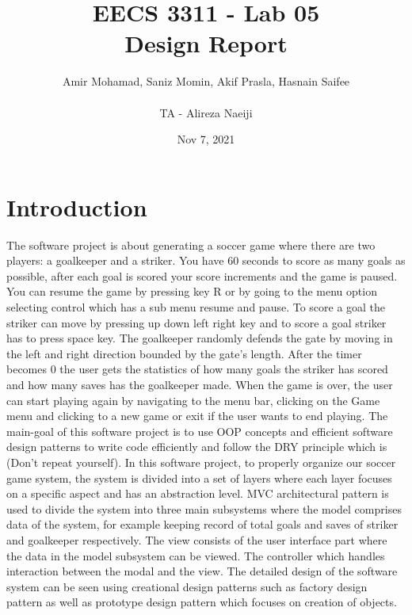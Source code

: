 \documentclass[12pt, dvipsnames, a4paper]{article}
\begin{document}
\title{\textbf{EECS 3311 - Lab 05\\Design Report}}
\author{Amir Mohamad, Saniz Momin, Akif Prasla, Hasnain Saifee\\\\TA - Alireza Naeiji}
\date{Nov 7, 2021}
\maketitle
\tableofcontents
\clearpage

\section{Introduction}

The software project is about generating a soccer game where there are two players:
a goalkeeper and a striker. You have 60 seconds to score as many goals as possible,
after each goal is scored your score increments and the game is paused. You can resume
the game by pressing key R or by going to the menu option selecting control which has a
sub menu resume and pause. To score a goal the striker can move by pressing up down left
right key and to score a goal striker has to press space key. The goalkeeper randomly defends
the gate by moving in the left and right direction bounded by the gate's length. After the
timer becomes 0 the user gets the statistics of how many goals the striker has scored and how
many saves has the goalkeeper made. When the game is over, the user can start playing again
by navigating to the menu bar, clicking on the Game menu and clicking to a new game or exit
if the user wants to end playing. The main-goal of this software project is to use OOP concepts
and efficient software design patterns to write code efficiently and follow the DRY principle
which is (Don't repeat yourself). In this software project, to properly organize our soccer
game system, the system is divided into a set of layers where each layer focuses on a
specific aspect and has an abstraction level. MVC architectural pattern is used to divide
the system into three main subsystems where the model comprises data of the system, for
example keeping record of total goals and saves of striker and goalkeeper respectively.
The view consists of the user interface part where the data in the model subsystem can be
viewed. The controller which handles interaction between the modal and the view. The detailed
design of the software system can be seen using creational design patterns such as factory
design pattern as well as prototype design pattern which focuses on creation of objects.
\end{document}
